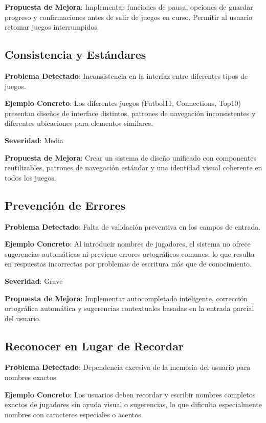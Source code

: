 \documentclass{article}
\begin{document}
	\noindent
	\textbf{Propuesta de Mejora}: Implementar funciones de pausa, opciones de guardar progreso y confirmaciones antes de salir de juegos en curso. Permitir al usuario retomar juegos interrumpidos.

	\subsection{Consistencia y Estándares}
	\noindent
	\textbf{Problema Detectado}: Inconsistencia en la interfaz entre diferentes tipos de juegos.
	
	\noindent
	\textbf{Ejemplo Concreto}: Los diferentes juegos (Futbol11, Connections, Top10) presentan diseños de interface distintos, patrones de navegación inconsistentes y diferentes ubicaciones para elementos similares.
	
	\noindent
	\textbf{Severidad}: Media
	
	\noindent
	\textbf{Propuesta de Mejora}: Crear un sistema de diseño unificado con componentes reutilizables, patrones de navegación estándar y una identidad visual coherente en todos los juegos.

	\subsection{Prevención de Errores}
	\noindent
	\textbf{Problema Detectado}: Falta de validación preventiva en los campos de entrada.
	
	\noindent
	\textbf{Ejemplo Concreto}: Al introducir nombres de jugadores, el sistema no ofrece sugerencias automáticas ni previene errores ortográficos comunes, lo que resulta en respuestas incorrectas por problemas de escritura más que de conocimiento.
	
	\noindent
	\textbf{Severidad}: Grave
	
	\noindent
	\textbf{Propuesta de Mejora}: Implementar autocompletado inteligente, corrección ortográfica automática y sugerencias contextuales basadas en la entrada parcial del usuario.

	\subsection{Reconocer en Lugar de Recordar}
	\noindent
	\textbf{Problema Detectado}: Dependencia excesiva de la memoria del usuario para nombres exactos.
	
	\noindent
	\textbf{Ejemplo Concreto}: Los usuarios deben recordar y escribir nombres completos exactos de jugadores sin ayuda visual o sugerencias, lo que dificulta especialmente nombres con caracteres especiales o acentos.
	
\end{document}
